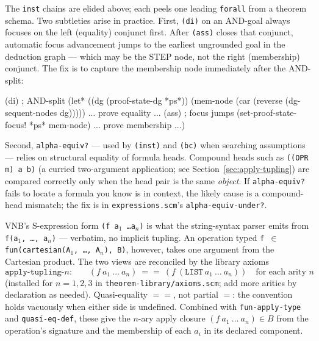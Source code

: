 \begin{remark}
The \texttt{inst} chains are elided above; each peels one leading
\texttt{forall} from a theorem schema.  Two subtleties arise in practice.
First, \texttt{(di)} on an AND-goal always focuses on the left (equality)
conjunct first.  After \texttt{(ass)} closes that conjunct, automatic
focus advancement jumps to the earliest ungrounded goal in the deduction
graph --- which may be the STEP node, not the right (membership) conjunct.
The fix is to capture the membership node
immediately after the AND-split:
\begin{VNBcode}
(di)   ; AND-split
(let* ((dg       (proof-state-dg *ps*))
       (mem-node (car (reverse (dg-sequent-nodes dg)))))
  ... prove equality ... (ass)   ; focus jumps
  (set-proof-state-focus! *ps* mem-node)
  ... prove membership ...)
\end{VNBcode}

Second, \texttt{alpha-equiv?} --- used by \texttt{(inst)} and
\texttt{(bc)} when searching assumptions --- relies on structural
equality of formula heads.  Compound heads such as
\texttt{((OPR m) a b)} (a curried two-argument application; see
Section~\ref{sec:apply-tupling}) are compared correctly only when
the head pair is the same \emph{object}.  If \texttt{alpha-equiv?}
fails to locate a formula you know is in context, the likely cause
is a compound-head mismatch; the fix is in
\texttt{expressions.scm}'s \texttt{alpha-equiv-under?}.
\end{remark}

\begin{remark}
\label{sec:apply-tupling}
VNB's S-expression form \texttt{(f a$_1$ \ldots a$_n$)} is what the
string-syntax parser emits from \texttt{f(a$_1$,\,\ldots,\,a$_n$)} ---
verbatim, no implicit tupling.  An operation typed
\texttt{f $\in$ fun(cartesian(A$_1$,\,\ldots,\,A$_n$),~B)}, however,
takes one argument from the Cartesian product.  The two views are
reconciled by the library axioms
\begin{equation*}
\texttt{apply-tupling-$n$:} \qquad
(f\ a_1\ \ldots\ a_n)\ \mathrel{==}\ (f\ (\texttt{LIST}\ a_1\ \ldots\ a_n))
\quad\text{for each arity }n
\end{equation*}
(installed for $n=1,2,3$ in \texttt{theorem-library/axioms.scm};
add more arities by declaration as needed).  Quasi-equality
$\mathrel{==}$, not partial $=$: the convention holds vacuously when
either side is undefined.  Combined with \texttt{fun-apply-type} and
\texttt{quasi-eq-def}, these give the $n$-ary apply closure
\((f\ a_1\ \ldots\ a_n)\in B\) from the operation's signature and
the membership of each $a_i$ in its declared component.
\end{remark}

